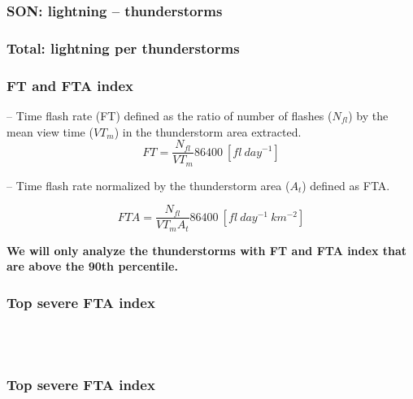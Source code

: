 \documentclass[smaller]{beamer}
\begin{document}
\begin{frame}
\frametitle{SON: lightning -- thunderstorms}

\end{frame}


\begin{frame}
\frametitle{Total: lightning per thunderstorms}

\end{frame}





\begin{frame}
\frametitle{FT and FTA index}

-- Time flash rate (FT) defined as the ratio of number of flashes ($N_{fl}$) by the mean view time ($VT_m$) in the thunderstorm area extracted.	
\begin{equation}
FT = \frac{N_{fl} }{VT_m} 86400 ~[fl~day^{-1}]    
\end{equation}

-- Time flash rate normalized by the thunderstorm area ($A_t$) defined as FTA. 

\begin{equation}
FTA = \frac{N_{fl} }{VT_m A_t } 86400 ~[fl~day^{-1}~km^{-2}]
\end{equation}

\bigskip
\textbf{We will only analyze the thunderstorms with FT and FTA index that are above the 90th percentile.} 

\end{frame}

\begin{frame}
\frametitle{Top severe FTA index}
~~
\\
\\

\end{frame}


\begin{frame}
\frametitle{Top severe FTA index}
~~
\\
\\

\end{frame}
\end{document}

